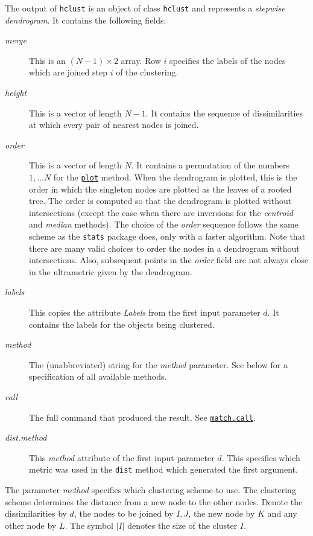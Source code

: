 \documentclass[fontsize=10pt,paper=letter,BCOR=-6mm,DIV=8]{scrartcl}
\makeatletter
\newcommand*\q{\textquotesingle}
\newcommand*\plot{\href{https://stat.ethz.ch/R-manual/R-patched/library/graphics/html/plot.html}{\texttt{plot}}}
\newcommand*\matchcall{\href{https://stat.ethz.ch/R-manual/R-patched/library/base/html/match.call.html}{\texttt{match.call}}}
\newenvironment{methods}{%
  \list{}{\labelwidth\z@
    \itemindent-\leftmargin
    \let\makelabel\methodslabel}%
}{%
  \endlist
}
\newcommand*{\methodslabel}[1]{%
  \hbox to \textwidth{\hspace{\labelsep}%
  \normalfont\bfseries\ttfamily
  #1\hskip-\labelsep\hfill}%
}
\makeatother
\begin{document}
\begin{methods}
The output of \texttt{hclust} is an object of class \texttt{\q hclust\q} and represents a \emph{stepwise dendrogram}. It contains the following fields:
\begin{description}
\item[\normalfont\textit{merge}]
This is an $(N-1)\times 2$ array. Row $i$ specifies the labels of the nodes which are joined step $i$ of the clustering.

\item[\normalfont\textit{height}]
This is a vector of length $N-1$. It contains the sequence of dissimilarities at which every pair of nearest nodes is joined.

\item[\normalfont\textit{order}]
This is a vector of length $N$. It contains a permutation of the numbers $1,\ldots N$ for the \plot{} method. When the dendrogram is plotted, this is the order in which the singleton nodes are plotted as the leaves of a rooted tree. The order is computed so that the dendrogram is plotted without intersections (except the case when there are inversions for the \textit{\q centroid\q} and \textit{\q median\q} methods). The choice of the \textit{\q order\q} sequence follows the same scheme as the \texttt{stats} package does, only with a faster algorithm. Note that there are many valid choices to order the nodes in a dendrogram without intersections. Also, subsequent points in the \textit{\q order\q} field are not always close in the ultrametric given by the dendrogram.

\item[\normalfont\textit{labels}]
This copies the attribute \textit{\q Labels\q} from the first input parameter $d$. It contains the labels for the objects being clustered.

\item[\normalfont\textit{method}]
The (unabbreviated) string for the \textit{\q method\q} parameter. See below for a specification of all available methods.

\item[\normalfont\textit{call}]
The full command that produced the result. See \matchcall.

\item[\normalfont\textit{dist.method}]
This \textit{\q method\q} attribute of the first input parameter $d$. This specifies which metric was used in the \texttt{dist} method which generated the first argument.
\end{description}

The parameter \textit{method} specifies which clustering scheme to use. The clustering scheme determines the distance from a new node to the other nodes. Denote the dissimilarities by $d$, the nodes to be joined by $I,J$, the new node by $K$ and any other node by $L$. The symbol $|I|$ denotes the size of the cluster $I$.


\end{methods}
\end{document}
